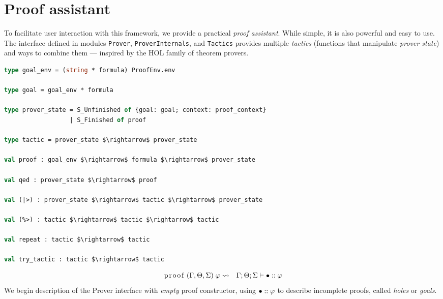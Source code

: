 \documentclass[english, mgr]{iithesis}
\renewcommand{\tt}[1]{\texttt{\small{#1}}}
\renewcommand{\it}[1]{\textit{#1}}
\begin{document}
\section{Proof assistant}
To facilitate user interaction with this framework, we provide a practical \it{proof assistant}.
While simple, it is also powerful and easy to use.
The interface defined in modules \tt{Prover}, \tt{ProverInternals}, and \tt{Tactics} provides multiple \it{tactics}
(functions that manipulate \it{prover state}) and ways to combine them
--- inspired by the HOL family of theorem provers.
\begin{lstlisting}[mathescape, language=OCaml]
type goal_env = (string * formula) ProofEnv.env

type goal = goal_env * formula

type prover_state = S_Unfinished of {goal: goal; context: proof_context}
                  | S_Finished of proof

type tactic = prover_state $\rightarrow$ prover_state

val proof : goal_env $\rightarrow$ formula $\rightarrow$ prover_state

val qed : prover_state $\rightarrow$ proof

val (|>) : prover_state $\rightarrow$ tactic $\rightarrow$ prover_state

val (%>) : tactic $\rightarrow$ tactic $\rightarrow$ tactic

val repeat : tactic $\rightarrow$ tactic

val try_tactic : tactic $\rightarrow$ tactic
\end{lstlisting}
\newcommand{\hole}{\ensuremath{\bullet}}
\begin{eqnarray*}
  \text{\lstinline[columns=fixed]{proof}}\;(\Gamma,\Theta,\Sigma)\;\formphi &  \leadsto & \jgmnt[\Gamma; \Theta; \Sigma]{\hole\ofkind\formphi}
  \end{eqnarray*}
We begin description of the Prover interface with \it{empty} proof constructor,
using $\hole\ofkind\formphi$ to describe incomplete proofs,
called \it{holes} or \it{goals}.
\end{document}
